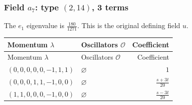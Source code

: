 \subsubsection{\texorpdfstring{Field $a_{7}$: type $(2,14)$, 3 terms}{Field a7: type (2,14), 3 terms}}
The $e_1$ eigenvalue is $\frac{180}{1271}$. This is the original defining field $u$.
\begingroup\scriptsize\setlength{\tabcolsep}{3pt}\renewcommand{\arraystretch}{1.35}
\begin{longtable}{@{}llr@{}}
\toprule Momentum $\lambda$&Oscillators $\mathcal O$&Coefficient\\\midrule\endfirsthead
\toprule Momentum $\lambda$&Oscillators $\mathcal O$&Coefficient\\\midrule\endhead
\bottomrule\endfoot
$(0,0,0,0,0,-1,1,1)$ & $\varnothing$ & $1$\\
$(0,0,0,1,1,-1,0,0)$ & $\varnothing$ & $\frac{s+3t}{20}$\\
$(1,1,0,0,0,-1,0,0)$ & $\varnothing$ & $\frac{s-3t}{20}$\\
\end{longtable}
\endgroup
